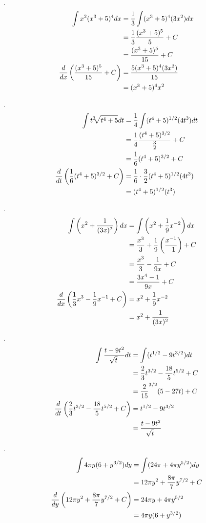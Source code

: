 \documentclass[11pt]{article}
\newcommand*{\vs}{\vspace{1cm}}
\newcommand*{\next}{\noindent}
\newcommand*{\set}{\setcounter{equation}{0}}
\newcommand*{\lt}{\left}
\newcommand*{\rt}{\right}
\begin{document}
\vs\next
16.\begin{align}
    \set
    \int x^2(x^3+5)^4dx&=\frac{1}{3}\int(x^3+5)^4(3x^2)dx\\
    &=\frac{1}{3}\frac{(x^3+5)^5}{5}+C\\
    &=\frac{(x^3+5)^5}{15}+C\\
    \frac{d}{dx}\lt(\frac{(x^3+5)^5}{15}+C\rt)&=\frac{5(x^3+5)^4(3x^2)}{15}\\
    &=(x^3+5)^4x^2
\end{align}

\vs\next
20.\begin{align}
    \set
    \int t^3\sqrt[]{t^4+5}dt&=\frac{1}{4}\int(t^4+5)^{1/2}(4t^3)dt\\
    &=\frac{1}{4}\frac{(t^4+5)^{3/2}}{\frac{3}{2}}+C\\
    &=\frac{1}{6}(t^4+5)^{3/2}+C\\
    \frac{d}{dt}\lt(\frac{1}{6}(t^4+5)^{3/2}+C\rt)&=\frac{1}{6}\cdot\frac{3}{2}(t^4+5)^{1/2}(4t^3)\\
    &=(t^4+5)^{1/2}(t^3)
\end{align}

\vs\next
30.\begin{align}
    \set
    \int\lt(x^2+\frac{1}{(3x)^2}\rt)dx&=\int\lt(x^2+\frac{1}{9}x^{-2}\rt)dx\\
    &=\frac{x^3}{3}+\frac{1}{9}\lt(\frac{x^{-1}}{-1}\rt)+C\\
    &=\frac{x^3}{3}-\frac{1}{9x}+C\\
    &=\frac{3x^4-1}{9x}+C\\
    \frac{d}{dx}\lt(\frac{1}{3}x^3-\frac{1}{9}x^{-1}+C\rt)&=x^2+\frac{1}{9}x^{-2}\\
    &=x^2+\frac{1}{(3x)^2}
\end{align}

\vs\next
34.\begin{align}
    \set
    \int\frac{t-9t^2}{\sqrt[]{t}}dt&=\int(t^{1/2}-9t^{3/2})dt\\
    &=\frac{2}{3}t^{3/2}-\frac{18}{5}t^{5/2}+C\\
    &=\frac{2}{15}^{3/2}(5-27t)+C\\
    \frac{d}{dt}\lt(\frac{2}{3}t^{3/2}-\frac{18}{5}t^{5/2}+C\rt)&=t^{1/2}-9t^{3/2}\\
    &=\frac{t-9t^2}{\sqrt[]{t}}
\end{align}

\vs\next
38.\begin{align}
    \set
    \int 4\pi y(6+y^{3/2})dy&=\int(24\pi+4\pi y^{5/2})dy\\
    &=12\pi y^2+\frac{8\pi}{7}y^{7/2}+C\\
    \frac{d}{dy}\lt(12\pi y^2+\frac{8\pi}{7}y^{7/2}+C\rt)&=24\pi y+4\pi y^{5/2}\\
    &=4\pi y(6+y^{3/2})
\end{align}
\end{document}

